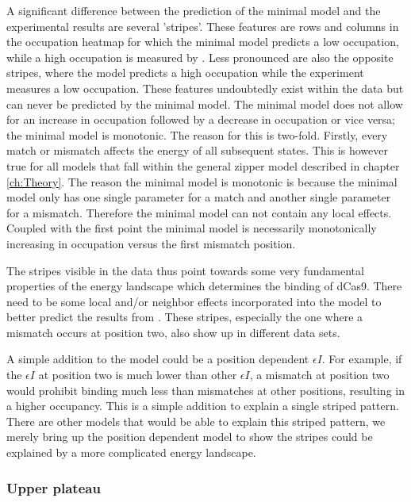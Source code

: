 A significant difference between the prediction of the minimal model and the experimental results are several 'stripes'. These features are rows and columns in the occupation heatmap for which the minimal model predicts a low occupation, while a high occupation is measured by \cite{PNAS}. Less pronounced are also the opposite stripes, where the model predicts a high occupation while the experiment measures a low occupation. These features undoubtedly exist within the data but can never be predicted by the minimal model. The minimal model does not allow for an increase in occupation followed by a decrease in occupation or vice versa; the minimal model is monotonic. The reason for this is two-fold. Firstly, every match or mismatch affects the energy of all subsequent states. This is however true for all models that fall within the general zipper model described in chapter \ref{ch:Theory}. The reason the minimal model is monotonic is because the minimal model only has one single parameter for a match and another single parameter for a mismatch. Therefore the minimal model can not contain any local effects. Coupled with the first point the minimal model is necessarily monotonically increasing in occupation versus the first mismatch position.

The stripes visible in the data thus point towards some very fundamental properties of the energy landscape which determines the binding of dCas9. There need to be some local and/or neighbor effects incorporated into the model to better predict the results from \cite{PNAS}. These stripes, especially the one where a mismatch occurs at position two, also show up in different data sets. %

A simple addition to the model could be a position dependent $\epsilon I$. For example, if the $\epsilon I$ at position two is much lower than other $\epsilon I$, a mismatch at position two would prohibit binding much less than mismatches at other positions, resulting in a higher occupancy. This is a simple addition to explain a single striped pattern. There are other models that would be able to explain this striped pattern, we merely bring up the position dependent model to show the stripes could be explained by a more complicated energy landscape.


\subsubsection{Upper plateau}


